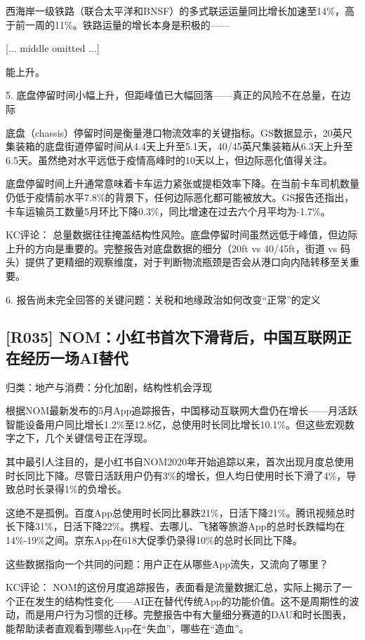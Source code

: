 \documentclass[11pt]{ctexart}
\begin{document}
西海岸一级铁路（联合太平洋和BNSF）的多式联运运量同比增长加速至14\%，高于前一周的11\%。铁路运量的增长本身是积极的——

[... middle omitted ...]

能上升。

5. 底盘停留时间小幅上升，但距峰值已大幅回落——真正的风险不在总量，在边际

底盘（chassis）停留时间是衡量港口物流效率的关键指标。GS数据显示，20英尺集装箱的底盘街道停留时间从4.4天上升至5.1天，40/45英尺集装箱从6.3天上升至6.5天。虽然绝对水平远低于疫情高峰时的10天以上，但边际恶化值得关注。

底盘停留时间上升通常意味着卡车运力紧张或提柜效率下降。在当前卡车司机数量仍低于疫情前水平7.8\%的背景下，任何边际恶化都可能被放大。GS报告还指出，卡车运输员工数量5月环比下降0.3\%，同比增速在过去六个月平均为-1.7\%。

KC评论： 总量数据往往掩盖结构性风险。底盘停留时间虽然远低于峰值，但边际上升的方向是重要的。完整报告对底盘数据的细分（20ft vs 40/45ft，街道 vs 码头）提供了更精细的观察维度，对于判断物流瓶颈是否会从港口向内陆转移至关重要。

6. 报告尚未完全回答的关键问题：关税和地缘政治如何改变“正常”的定义

\subsection{[R035] NOM：小红书首次下滑背后，中国互联网正在经历一场AI替代}
{\small\color{refgray}归类：地产与消费：分化加剧，结构性机会浮现}

根据NOM最新发布的5月App追踪报告，中国移动互联网大盘仍在增长——月活跃智能设备用户同比增长1.2\%至12.8亿，总使用时长同比增长10.1\%。但这些宏观数字之下，几个关键信号正在浮现。

其中最引人注目的，是小红书自NOM2020年开始追踪以来，首次出现月度总使用时长同比下降。尽管日活跃用户仍有3\%的增长，但人均日使用时长下滑了4\%，导致总时长录得1\%的负增长。

这绝不是孤例。百度App总使用时长同比暴跌21\%，日活下降21\%。腾讯视频总时长下降31\%，日活下降22\%。携程、去哪儿、飞猪等旅游App的总时长跌幅均在14\%-19\%之间。京东App在618大促季仍录得10\%的总时长同比下降。

这些数据指向一个共同的问题：用户正在从哪些App流失，又流向了哪里？

KC评论： NOM的这份月度追踪报告，表面看是流量数据汇总，实际上揭示了一个正在发生的结构性变化——AI正在替代传统App的功能价值。这不是周期性的波动，而是用户行为习惯的迁移。完整报告中有大量细分赛道的DAU和时长图表，能帮助读者直观看到哪些App在“失血”，哪些在“造血”。
\end{document}
